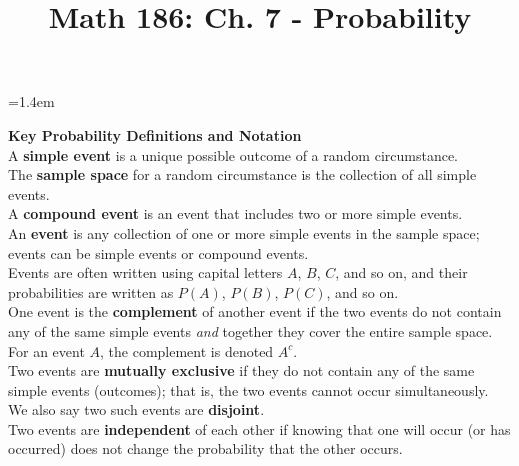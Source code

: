 \documentclass[12pt]{amsart}
\title{Math 186: Ch. 7 - Probability}
\begin{document}
\maketitle



\begin{list}
{}
{\leftmargin=1.4em}


\item[ ] {\bf Key Probability Definitions and Notation}\\

\subitem A {\bf simple event} is a unique possible outcome of a random circumstance.\\

\subitem The {\bf sample space} for a random circumstance is the collection of all simple events.\\

\subitem A {\bf compound event} is an event that includes two or more simple events.\\

\subitem An {\bf event} is any collection of one or more simple events in the sample space; events can be simple events or compound events.\\

\subitem Events are often written using capital letters $A$, $B$, $C$, and so on, and their probabilities are written as $P(A)$, $P(B)$, $P(C)$, and so on.\\

\subitem One event is the {\bf complement} of another event if the two events do not contain any of the same simple events {\it and} together they cover the entire sample space.  For an event $A$, the complement is denoted $A^c$.\\

\subitem Two events are {\bf mutually exclusive} if they do not contain any of the same simple events (outcomes); that is, the two events cannot occur simultaneously.  We also say two such events are {\bf disjoint}.\\

\subitem Two events are {\bf independent} of each other if knowing that one will occur (or has occurred) does not change the probability that the other occurs.\\


\end{list}
\end{document}
